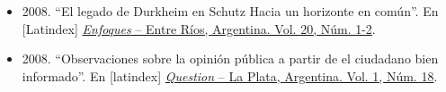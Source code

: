 \begin{itemize}
  \item 2008. ``El legado de Durkheim en Schutz Hacia un horizonte en común''. En [Latindex] \href{http://publicaciones.uap.edu.ar/index.php/revistaenfoques/article/view/245}{\textit{Enfoques} – Entre Ríos, Argentina. Vol. 20, Núm. 1-2}.
  
  \item 2008. ``Observaciones sobre la opinión pública a partir de el ciudadano bien informado''. En [latindex] \href{https://perio.unlp.edu.ar/ojs/index.php/question/article/view/537}{\textit{Question} – La Plata, Argentina. Vol. 1, Núm. 18}. \\
      
\end{itemize}  
  
\vspace{0.2in} %
